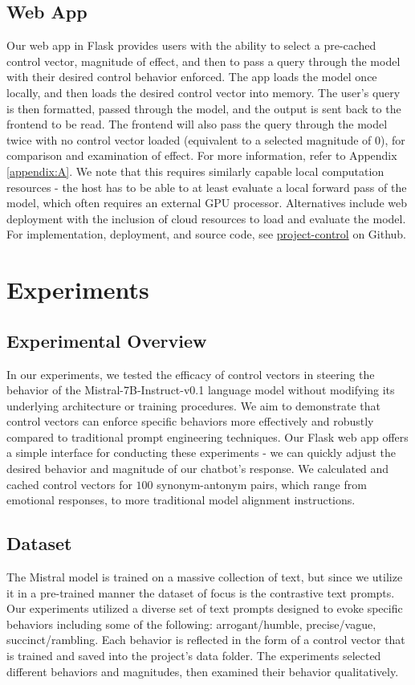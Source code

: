 \documentclass[11pt,a4paper]{article}
\begin{document}
\subsection{Web App}
Our web app in Flask provides users with the ability to select a pre-cached control vector, magnitude of effect, and then to pass a query through the model with their desired control behavior enforced. The app loads the model once locally, and then loads the desired control vector into memory. The user's query is then formatted, passed through the model, and the output is sent back to the frontend to be read. The frontend will also pass the query through the model twice with no control vector loaded (equivalent to a selected magnitude of 0), for comparison and examination of effect. For more information, refer to Appendix \ref{appendix:A}. We note that this requires similarly capable local computation resources - the host has to be able to at least evaluate a local forward pass of the model, which often requires an external GPU processor. Alternatives include web deployment with the inclusion of cloud resources to load and evaluate the model. For implementation, deployment, and source code, see \href{https://github.com/tulane-cmps6730/project-control}{project-control} on Github.


\section{Experiments}

\subsection{Experimental Overview}
In our experiments, we tested the efficacy of control vectors in steering the behavior of the Mistral-7B-Instruct-v0.1 language model without modifying its underlying architecture or training procedures. We aim to demonstrate that control vectors can enforce specific behaviors more effectively and robustly compared to traditional prompt engineering techniques. Our Flask web app offers a simple interface for conducting these experiments - we can quickly adjust the desired behavior and magnitude of our chatbot's response. We calculated and cached control vectors for $100$ synonym-antonym pairs, which range from emotional responses, to more traditional model alignment instructions.

\subsection{Dataset}
The Mistral model is trained on a massive collection of text, but since we utilize it in a pre-trained manner the dataset of focus is the contrastive text prompts. Our experiments utilized a diverse set of text prompts designed to evoke specific behaviors including some of the following: arrogant/humble, precise/vague, succinct/rambling. Each behavior is reflected in the form of a control vector that is trained and saved into the project's data folder. The experiments selected different behaviors and magnitudes, then examined their behavior qualitatively. 
\end{document}
